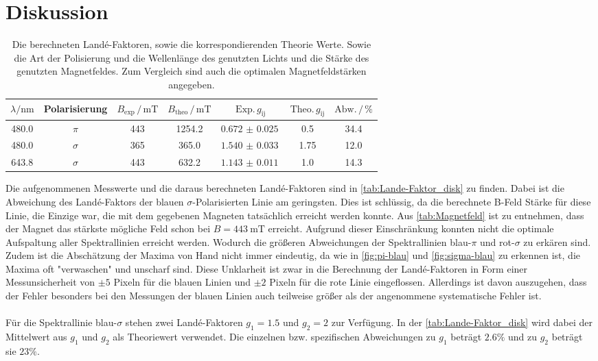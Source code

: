 \section{Diskussion}
\label{sec:Diskussion}
\begin{table}
    \caption{Die berechneten Landé-Faktoren, sowie die korrespondierenden Theorie Werte. Sowie die Art der Polisierung und die Wellenlänge des genutzten Lichts und die Stärke des genutzten Magnetfeldes. Zum Vergleich sind auch die optimalen Magnetfeldstärken angegeben.}
    \begin{tabular}{ccccccc}
        \toprule
        $\lambda / \si{\nano\meter}$ & Polarisierung & $B_\text{exp} \, /\, \si{\milli\tesla}$ &$B_\text{theo} \,/ \,\si{\milli\tesla}$& $\text{Exp.}\,g_\text{ij}$ & $\text{Theo.}\, g _\text{ij}$ & $\text{Abw.}\,/\,\%$\\
        \midrule
        480.0 & $\pi$    & 443 &  1254.2& $\SI{0.672(25)}{}$  & 0.5   &   34.4\\
        480.0 & $\sigma$ & 365 &  365.0 & $\SI{1.540(33)}{}$  & 1.75  &   12.0\\
        643.8 & $\sigma$ & 443 &  632.2 & $\SI{1.143(11)}{}$  & 1.0   &   14.3\\
        \bottomrule
    \end{tabular}
    \label{tab:Lande-Faktor_disk}
\end{table}
Die aufgenommenen Messwerte und die daraus berechneten Landé-Faktoren sind in \autoref{tab:Lande-Faktor_disk} zu finden.
Dabei ist die Abweichung des Landé-Faktors der blauen $\sigma$-Polarisierten Linie am geringsten.
Dies ist schlüssig, da die berechnete B-Feld Stärke für diese Linie, die Einzige war, die mit dem gegebenen Magneten tatsächlich erreicht werden konnte.
Aus \autoref{tab:Magnetfeld} ist zu entnehmen, dass der Magnet das stärkste mögliche Feld schon bei $B = \SI{443}{\milli\tesla}$ erreicht.
Aufgrund dieser Einschränkung konnten nicht die optimale Aufspaltung aller Spektrallinien erreicht werden.
Wodurch die größeren Abweichungen der Spektrallinien blau-$\pi$ und rot-$\sigma$ zu erkären sind.
Zudem ist die Abschätzung der Maxima von Hand nicht immer eindeutig, da wie in \autoref{fig:pi-blau} und \autoref{fig:sigma-blau} zu erkennen ist, die Maxima oft "verwaschen" und unscharf sind.
Diese Unklarheit ist zwar in die Berechnung der Landé-Faktoren in Form einer Messunsicherheit von $\pm 5$ Pixeln für die blauen Linien und $\pm 2$ Pixeln für die rote Linie eingeflossen.
Allerdings ist davon auszugehen, dass der Fehler besonders bei den Messungen der blauen Linien auch teilweise größer als der angenommene systematische Fehler ist.
\\\\
Für die Spektrallinie blau-$\sigma$ stehen zwei Landé-Faktoren $g_1 = 1.5$ und $g_2 = 2$ zur Verfügung.
In der \autoref{tab:Lande-Faktor_disk} wird dabei der Mittelwert aus $g_1$ und $g_2$ als Theoriewert verwendet.
Die einzelnen bzw. spezifischen Abweichungen zu $g_1$ beträgt $2.6\%$ und zu $g_2$ beträgt sie $23\%$.
